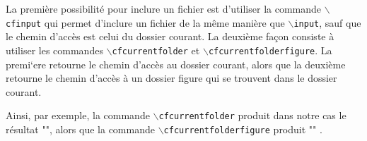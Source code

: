 La premi\`ere possibilit\'e pour inclure un fichier est d'utiliser la commande {\tt $\backslash$cfinput} qui permet d'inclure un fichier de la m\^eme mani\`ere que {\tt $\backslash$input}, sauf que le chemin d'acc\`es est celui du dossier courant. La deuxi\`eme fa\c{c}on consiste \`a utiliser les commandes {\tt $\backslash$cfcurrentfolder} et {\tt $\backslash$cfcurrentfolderfigure}. La premi`ere retourne le chemin d'acc\`es au dossier courant, alors que la deuxi\`eme retourne le chemin d'acc\`es \`a un dossier figure qui se trouvent dans le dossier courant.

Ainsi, par exemple, la commande {\tt $\backslash$cfcurrentfolder} produit dans notre cas le r\'esultat "\cfcurrentfolder", alors que la commande {\tt $\backslash$cfcurrentfolderfigure} produit "\cfcurrentfolderfigure" .